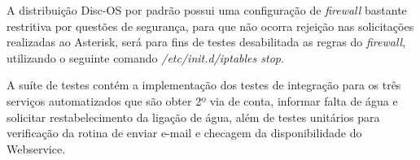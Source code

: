 A distribuição Disc-OS por padrão possui uma configuração de \textit{firewall} bastante restritiva por questões de segurança, para que não ocorra rejeição nas solicitações realizadas ao Asterisk, será para fins de testes desabilitada as regras do \textit{firewall}, utilizando o seguinte comando \textit{/etc/init.d/iptables stop}.
 
A suíte de testes contém a implementação dos testes de integração para os três serviços automatizados que são obter 2º via de conta, informar falta de água e solicitar restabelecimento da ligação de água, além de testes unitários para verificação da rotina de enviar e-mail e checagem da disponibilidade do Webservice.


